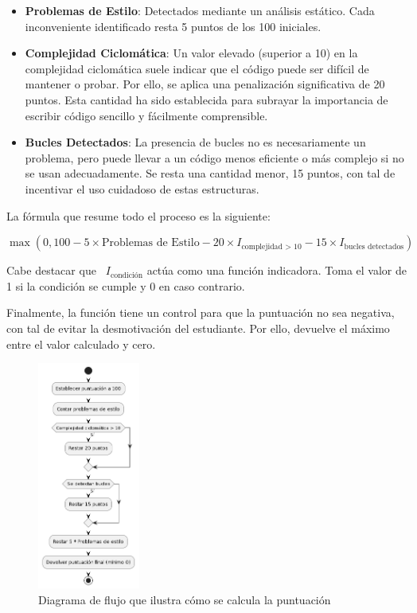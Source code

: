 \begin{itemize}
    \item \textbf{Problemas de Estilo}: Detectados mediante un análisis estático. Cada inconveniente identificado resta 5 puntos de los 100 iniciales.
    
    \item \textbf{Complejidad Ciclomática}: Un valor elevado (superior a 10) en la complejidad ciclomática suele indicar que el código puede ser difícil de mantener o probar. Por ello, se aplica una penalización significativa de 20 puntos. Esta cantidad ha sido establecida para subrayar la importancia de escribir código sencillo y fácilmente comprensible.
        
    \item \textbf{Bucles Detectados}: La presencia de bucles no es necesariamente un problema, pero puede llevar a un código menos eficiente o más complejo si no se usan adecuadamente. Se resta una cantidad menor, 15 puntos, con tal de incentivar el uso cuidadoso de estas estructuras.    
\end{itemize}

La fórmula que resume todo el proceso es la siguiente:

\begin{equation}
\max \left( 0, 100 - 5 \times \text{Problemas de Estilo} - 20 \times I_{\text{complejidad > 10}} - 15 \times I_{\text{bucles detectados}} \right)
\end{equation}

Cabe destacar que \texttt{ $I_{\text{condición}}$} actúa como una función indicadora. Toma el valor de 1 si la condición se cumple y 0 en caso contrario. 

Finalmente, la función tiene un control para que la puntuación no sea negativa, con tal de evitar la desmotivación del estudiante. Por ello, devuelve el máximo entre el valor calculado y cero.

\begin{figure}[H]
    \centering
    \includegraphics[width=0.3\textwidth]{imagenes/puntuacionejercicio.png}
    \caption{Diagrama de flujo que ilustra cómo se calcula la puntuación}
    \label{fig:puntuacion}
\end{figure}


